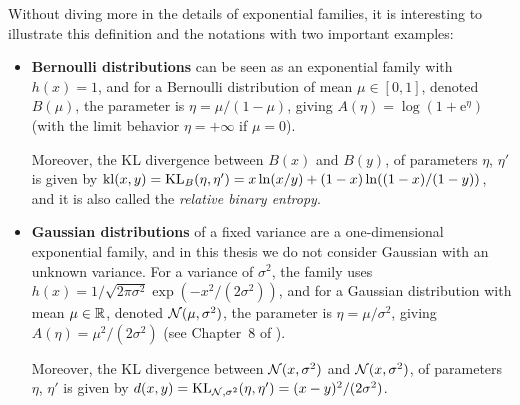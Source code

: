 Without diving more in the details of exponential families,
it is interesting to illustrate this definition and the notations with two important examples:
%
\begin{itemize}
    \item
    \textbf{Bernoulli distributions} can be seen as an exponential family with $h(x) = 1$,
    and for a Bernoulli distribution of mean $\mu\in[0,1]$, denoted $B(\mu)$,
    the parameter is $\eta = \mu / (1 - \mu)$, giving $A(\eta) = \log(1 + \mathrm{e}^{\eta})$
    (with the limit behavior $\eta=+\infty$ if $\mu=0$).

    Moreover, the KL divergence between $B(x)$ and $B(y)$, of parameters $\eta$, $\eta'$ is given by
    $\mathrm{kl}(x,y) = \mathrm{KL}_{B}(\eta,\eta') = x \ln(x/y) + (1-x) \ln((1-x)/(1-y))$,
    and it is also called the \emph{relative binary entropy}.

    \item
    \textbf{Gaussian distributions} of a fixed variance are a one-dimensional exponential family,
    and in this thesis we do not consider Gaussian with an unknown variance.
    For a variance of $\sigma^2$, the family uses
    $h(x) = 1/\sqrt{2\pi\sigma^2} \exp(-x^2/(2\sigma^2))$,
    and for a Gaussian distribution with mean $\mu\in\mathbb{R}$, denoted $\mathcal{N}(\mu,\sigma^2)$,
    the parameter is $\eta = \mu/\sigma^2$, giving $A(\eta) = \mu^2/(2\sigma^2)$
    (see Chapter~8 of \cite{JordanCourseStatBerkeley}).

    Moreover, the KL divergence between $\mathcal{N}(x,\sigma^2)$ and $\mathcal{N}(x,\sigma^2)$, of parameters $\eta$, $\eta'$ is given by
    $d(x,y) = \mathrm{KL}_{\mathcal{N},\sigma^2}(\eta,\eta') = (x-y)^2 / (2\sigma^2)$.
\end{itemize}


